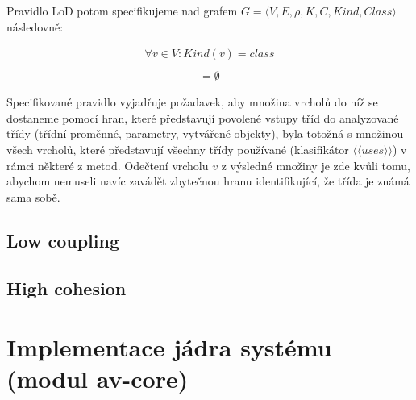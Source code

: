 Pravidlo LoD potom specifikujeme nad grafem $G = \langle V, E, \rho, K, C, \mathit{Kind}, \mathit{Class}\rangle$ následovně:

\begin{align*}
\forall v \in V: Kind(v) = class\\
\end{align*}
\begin{align*}
[((&F(G, v, class, \langle\langle{}has\_field\rangle\rangle{}) \cup F(G, v, class, \langle\langle{}has\_param\rangle\rangle{}) \cup\\
&F(G, v, class, \langle\langle{}instantiates\rangle\rangle{})) \cap F(v, class, \langle\langle{}uses\rangle\rangle{}) \setminus \{v\}] = \emptyset
\end{align*}

Specifikované pravidlo vyjadřuje požadavek, aby množina vrcholů do níž se dostaneme pomocí hran, které představují povolené vstupy tříd do analyzované třídy (třídní proměnné, parametry, vytvářené objekty), byla totožná s množinou všech vrcholů, které představují všechny třídy používané (klasifikátor $\langle\langle{}uses\rangle\rangle$) v rámci některé z metod. Odečtení vrcholu $v$ z výsledné množiny je zde kvůli tomu, abychom nemuseli navíc zavádět zbytečnou hranu identifikující, že třída je známá sama sobě.

\subsection{Low coupling}



\subsection{High cohesion}

\section{Implementace jádra systému (modul av-core)}

